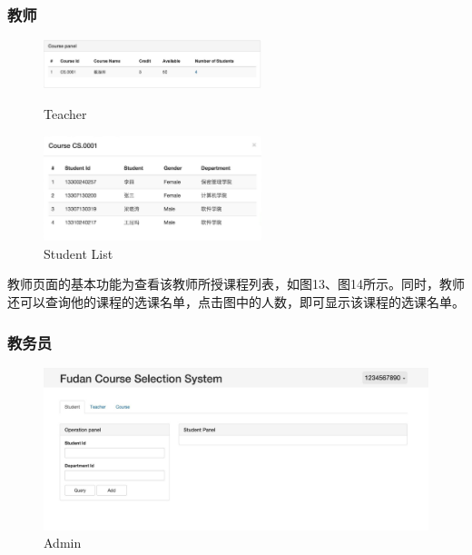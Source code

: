 \documentclass[a4paper, 11pt, nofonts, nocap, fancyhdr]{ctexart}
\begin{document}
\newpage
\subsubsection{教师}

	\begin{figure}[h]
		\begin{minipage}{0.5\textwidth}
			\centering
			\includegraphics[width=2.5in]{teacher}
			\caption{Teacher}
		\end{minipage}%
		\begin{minipage}{0.5\textwidth}
			\centering
			\includegraphics[width=2.5in]{adteacou}
			\caption{Student List}
		\end{minipage}
			\vspace{0.8cm}

	\end{figure}

	教师页面的基本功能为查看该教师所授课程列表，如图13、图14所示。同时，教师还可以查询他的课程的选课名单，点击图中的人数，即可显示该课程的选课名单。

\newpage
\subsubsection{教务员}

	\begin{figure}[h]
		\centering
		\includegraphics[width=6in]{adover}
		\caption{Admin}
	\end{figure}
\end{document}
